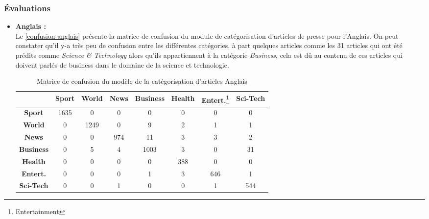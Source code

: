         \subsubsection{Évaluations}
        \begin{itemize}[leftmargin=*]
            \item{\textbf{Anglais :} }\\
                Le \autoref{confusion-anglais} présente la matrice de confusion du module de catégorisation d'articles de presse pour l'Anglais. On peut constater qu'il y-a très peu de confusion entre les différentes catégories, à part quelques articles comme les 31 articles qui ont été prédits comme \emph{Science \& Technology} alors qu'ils appartiennent à la catégorie \emph{Business}, cela est dû au contenu de ces articles qui doivent parlés de business dans le domaine de la science et technologie. 
                \begin{table}[H]
                    \begin{center}
                        \begin{tabular}{|c|c|c|c|c|c|c|c|}
                            \cline{2-8}
                            \multicolumn{1}{c|}{} & \textbf{Sport} &  \textbf{World} &  \textbf{News} &  \textbf{Business} &  \textbf{Health} & \textbf{Entert.\footnote{Entertainment}} &  \textbf{Sci-Tech} \\
                            \hline
                            \textbf{Sport} & 1635 & 0 & 0 & 0 & 0 & 0 & 0 \\
                            \textbf{World}  & 0 & 1249 & 0 & 9 & 2 & 1 & 1 \\
                            \textbf{News}  & 0 & 0 & 974 & 11 & 3 & 3 & 2 \\
                            \textbf{Business}  & 0 & 5 & 4 & 1003 & 3 & 0 & 31 \\
                            \textbf{Health}  & 0 & 0 & 0 & 0 & 388 & 0 & 0 \\
                            \textbf{Entert.}  & 0 & 0 & 0 & 1 & 3 & 646 & 1 \\
                            \textbf{Sci-Tech}  & 0 & 0 & 1 & 0 & 0 & 1 & 544 \\
                            \hline
                        \end{tabular}
                    \end{center}
                    \caption{Matrice de confusion du modèle de la catégorisation d'articles Anglais}
                    \label{confusion-anglais}

\end{table}
\end{itemize}
